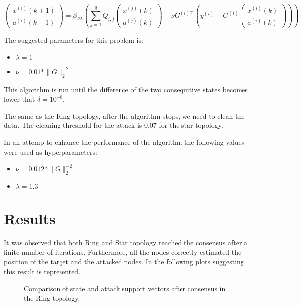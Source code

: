 \begin{equation}
\begin{pmatrix}
x^{(i)}(k+1) \\
a^{(i)}(k+1)
\end{pmatrix}
=
\mathcal{S}_{\nu \lambda} \left(
\sum_{j=1}^{q} Q_{i,j}
\begin{pmatrix}
x^{(j)}(k) \\
a^{(j)}(k)
\end{pmatrix}
-
\nu G^{(i)\top} \left( y^{(i)} -
G^{(i)}
\begin{pmatrix}
x^{(i)}(k) \\
a^{(i)}(k)
\end{pmatrix}
\right)
\right)
\end{equation}

The suggested parameters for this problem is:
\begin{itemize}
	\item $\lambda = 1$
	\item $\nu = 0.01*\|G\|_2^{-2}$
\end{itemize}

This algorithm is run until the difference of the two consequitive states becomes lower that $\delta = 10^{-8}$.

The same as the Ring topology, after the algorithm stops, we need to clean the data. The cleaning threshold for the attack is 0.07 for the star topology.

In an attemp to enhance the performance of the algorithm the following values were used as hyperparameters:
\begin{itemize}
	\item $\nu = 0.012*\|G\|_2^{-2}$
	\item $\lambda= 1.3$
\end{itemize}


\section{Results}
It was observed that both Ring and Star topology reached the consensus after a finite number of iterations. Furthermore, all the nodes correctly estimated the position of the target and the attacked nodes. In the following plots suggesting this result is represented. 
\begin{figure}[H]
    \centering
    \hspace{1cm} %
    \caption{Comparison of state and attack support vectors after consensus in the Ring topology.}
\end{figure}

